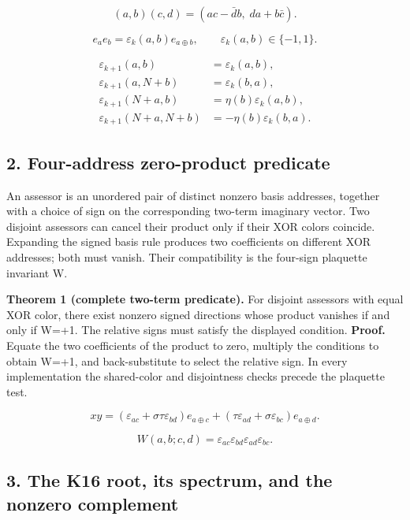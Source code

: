 \documentclass[
  10pt,
]{article}
\begin{document}
\[
(a,b)(c,d)=(ac-\bar d b,\;da+b\bar c).
\tag{1}
\]

\[
e_a e_b=\varepsilon_k(a,b)e_{a\oplus b},\qquad \varepsilon_k(a,b)\in\{-1,1\}.
\tag{2}
\]

\[
\begin{aligned}
\varepsilon_{k+1}(a,b)&=\varepsilon_k(a,b),\\
\varepsilon_{k+1}(a,N+b)&=\varepsilon_k(b,a),\\
\varepsilon_{k+1}(N+a,b)&=\eta(b)\varepsilon_k(a,b),\\
\varepsilon_{k+1}(N+a,N+b)&=-\eta(b)\varepsilon_k(b,a).
\end{aligned}\tag{3}
\]

\subsection{2. Four-address zero-product
predicate}\label{four-address-zero-product-predicate}

An assessor is an unordered pair of distinct nonzero basis addresses,
together with a choice of sign on the corresponding two-term imaginary
vector. Two disjoint assessors can cancel their product only if their
XOR colors coincide. Expanding the signed basis rule produces two
coefficients on different XOR addresses; both must vanish. Their
compatibility is the four-sign plaquette invariant W.

\textbf{Theorem 1 (complete two-term predicate).} For disjoint assessors
with equal XOR color, there exist nonzero signed directions whose
product vanishes if and only if W=+1. The relative signs must satisfy
the displayed condition. \textbf{Proof.} Equate the two coefficients of
the product to zero, multiply the conditions to obtain W=+1, and
back-substitute to select the relative sign. In every implementation the
shared-color and disjointness checks precede the plaquette test.

\[
xy=(\varepsilon_{ac}+\sigma\tau\varepsilon_{bd})e_{a\oplus c}+(\tau\varepsilon_{ad}+\sigma\varepsilon_{bc})e_{a\oplus d}.
\tag{4}
\]

\[
W(a,b;c,d)=\varepsilon_{ac}\varepsilon_{bd}\varepsilon_{ad}\varepsilon_{bc}.
\tag{5}
\]

\subsection{3. The K16 root, its spectrum, and the nonzero
complement}\label{the-k16-root-its-spectrum-and-the-nonzero-complement}
\end{document}

